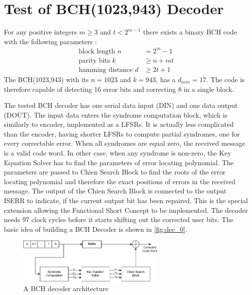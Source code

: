 \section{Test of BCH(1023,943) Decoder}

For any positive integers $m \geq 3$ and $t<2^{m-1}$ there exists a binary BCH code with the following parameters \cite{art:BCH_implement}:
\begin{subequations}
\begin{align}
    \text{block length }n&=2^{m}-1\label{eq:blck_len}\\
    \text{parity bits }k&\geq n+mt\label{eq:parity}\\
    \text{hamming distance }d&\geq2t+1\label{eq:dmin}
\end{align}
\end{subequations}
The BCH(1023,943) with its $n = 1023$ and $k=943$, has a $d_{min}= 17$. The code is therefore capable of detecting 16 error bits and correcting 8 in a single block. 

The tested BCH decoder has one serial data input (DIN) and one data output (DOUT). The input data enters the syndrome computation block, which is similarly to encoder, implemented as a LFSRs. It is actually less complicated than the encoder, having shorter LFSRs to compute partial syndromes, one for every correctable error. When all syndromes are equal zero, the received message is a valid code word. In other case, when any syndrome is non-zero, the Key Equation Solver has to find the parameters of error locating polynomial. The parameters are passed to Chien Search Block to find the roots of the error locating polynomial and therefore the exact positions of errors in the received message. The output of the Chien Search Block is connected to the output ISERR to indicate, if the current output bit has been repaired. This is the special extension allowing the Functional Short Concept to be implemented. The decoder needs 97 clock cycles before it starts shifting out the corrected user bits. The basic idea of building a BCH Decoder is shown in \autoref{fig:dec_0}.

\begin{figure}[h]
\centering
\includegraphics[width=0.65\textwidth]{figures/BCH_DEC.png}
\caption{A BCH decoder architecture \cite{art:BCH_implement}}
\label{fig:dec_0}
\end{figure}


